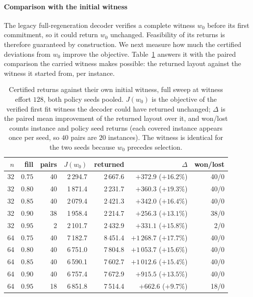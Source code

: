 \documentclass[preprint,12pt,authoryear]{elsarticle}
\begin{document}
\paragraph{Comparison with the initial witness}
The legacy full-regeneration decoder verifies a complete witness $w_0$ before its
first commitment, so it could return $w_0$ unchanged. Feasibility of its
returns is therefore guaranteed by construction. We next measure how much the
certified deviations from $w_0$ improve the objective.
Table~\ref{tab:witnessgap} answers it with the paired comparison the carried
witness makes possible: the returned layout against the witness it started
from, per instance.

\begin{table}[t]
\centering
\caption{Certified returns against their own initial witness, full sweep at
witness effort $128$, both policy seeds pooled. $J(w_0)$ is the objective of
the verified first fit witness the decoder could have returned unchanged;
$\Delta$ is the paired mean improvement of the returned layout over it, and
won/lost counts instance and policy seed returns (each covered instance
appears once per seed, so $40$ pairs are $20$ instances). The witness is
identical for
the two seeds because $w_0$ precedes selection.}
\label{tab:witnessgap}
\small
\begin{tabular}{@{}rrrrrrr@{}}
\toprule
$n$ & fill & pairs & $J(w_0)$ & returned & $\Delta$ & won/lost \\
\midrule
32 & $0.75$ & 40 & 2\,294.7 & 2\,667.6 & $+372.9$ ($+16.2\%$) & 40/0 \\
32 & $0.80$ & 40 & 1\,871.4 & 2\,231.7 & $+360.3$ ($+19.3\%$) & 40/0 \\
32 & $0.85$ & 40 & 2\,079.4 & 2\,421.3 & $+342.0$ ($+16.4\%$) & 40/0 \\
32 & $0.90$ & 38 & 1\,958.4 & 2\,214.7 & $+256.3$ ($+13.1\%$) & 38/0 \\
32 & $0.95$ &  2 & 2\,101.7 & 2\,432.9 & $+331.1$ ($+15.8\%$) &  2/0 \\
\midrule
64 & $0.75$ & 40 & 7\,182.7 & 8\,451.4 & $+1\,268.7$ ($+17.7\%$) & 40/0 \\
64 & $0.80$ & 40 & 6\,751.0 & 7\,804.8 & $+1\,053.7$ ($+15.6\%$) & 40/0 \\
64 & $0.85$ & 40 & 6\,590.1 & 7\,602.7 & $+1\,012.6$ ($+15.4\%$) & 40/0 \\
64 & $0.90$ & 40 & 6\,757.4 & 7\,672.9 & $+915.5$ ($+13.5\%$) & 40/0 \\
64 & $0.95$ & 18 & 6\,851.8 & 7\,514.4 & $+662.6$ ($+9.7\%$) & 18/0 \\
\bottomrule
\end{tabular}
\end{table}
\end{document}

